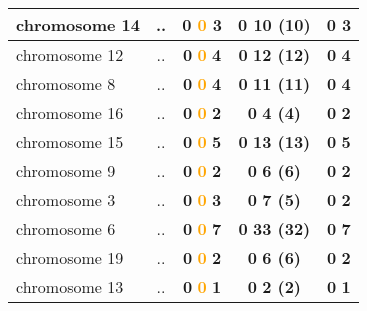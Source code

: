\begin{table}[H]
\begin{tabular}{||l|c|c|c|c||}
\hline
chromosome 14&..&\textcolor{vert}{\textbf{0}} \textcolor{orange}{\textbf{0}} \textcolor{rose}{\textbf{3}} &\textcolor{vert}{\textbf{0}} \textcolor{rose}{\textbf{10 (10)}} &\textcolor{vert}{\textbf{0}} \textcolor{rose}{\textbf{3}} \\
\hline
chromosome 12&..&\textcolor{vert}{\textbf{0}} \textcolor{orange}{\textbf{0}} \textcolor{rose}{\textbf{4}} &\textcolor{vert}{\textbf{0}} \textcolor{rose}{\textbf{12 (12)}} &\textcolor{vert}{\textbf{0}} \textcolor{rose}{\textbf{4}} \\
\hline
chromosome 8&..&\textcolor{vert}{\textbf{0}} \textcolor{orange}{\textbf{0}} \textcolor{rose}{\textbf{4}} &\textcolor{vert}{\textbf{0}} \textcolor{rose}{\textbf{11 (11)}} &\textcolor{vert}{\textbf{0}} \textcolor{rose}{\textbf{4}} \\
\hline
chromosome 16&..&\textcolor{vert}{\textbf{0}} \textcolor{orange}{\textbf{0}} \textcolor{rose}{\textbf{2}} &\textcolor{vert}{\textbf{0}} \textcolor{rose}{\textbf{4 (4)}} &\textcolor{vert}{\textbf{0}} \textcolor{rose}{\textbf{2}} \\
\hline
chromosome 15&..&\textcolor{vert}{\textbf{0}} \textcolor{orange}{\textbf{0}} \textcolor{rose}{\textbf{5}} &\textcolor{vert}{\textbf{0}} \textcolor{rose}{\textbf{13 (13)}} &\textcolor{vert}{\textbf{0}} \textcolor{rose}{\textbf{5}} \\
\hline
chromosome 9&..&\textcolor{vert}{\textbf{0}} \textcolor{orange}{\textbf{0}} \textcolor{rose}{\textbf{2}} &\textcolor{vert}{\textbf{0}} \textcolor{rose}{\textbf{6 (6)}} &\textcolor{vert}{\textbf{0}} \textcolor{rose}{\textbf{2}} \\
\hline
chromosome 3&..&\textcolor{vert}{\textbf{0}} \textcolor{orange}{\textbf{0}} \textcolor{rose}{\textbf{3}} &\textcolor{vert}{\textbf{0}} \textcolor{rose}{\textbf{7 (5)}} &\textcolor{vert}{\textbf{0}} \textcolor{rose}{\textbf{2}} \\
\hline
chromosome 6&..&\textcolor{vert}{\textbf{0}} \textcolor{orange}{\textbf{0}} \textcolor{rose}{\textbf{7}} &\textcolor{vert}{\textbf{0}} \textcolor{rose}{\textbf{33 (32)}} &\textcolor{vert}{\textbf{0}} \textcolor{rose}{\textbf{7}} \\
\hline
chromosome 19&..&\textcolor{vert}{\textbf{0}} \textcolor{orange}{\textbf{0}} \textcolor{rose}{\textbf{2}} &\textcolor{vert}{\textbf{0}} \textcolor{rose}{\textbf{6 (6)}} &\textcolor{vert}{\textbf{0}} \textcolor{rose}{\textbf{2}} \\
\hline
chromosome 13&..&\textcolor{vert}{\textbf{0}} \textcolor{orange}{\textbf{0}} \textcolor{rose}{\textbf{1}} &\textcolor{vert}{\textbf{0}} \textcolor{rose}{\textbf{2 (2)}} &\textcolor{vert}{\textbf{0}} \textcolor{rose}{\textbf{1}} \\

\end{tabular}
\end{table}
